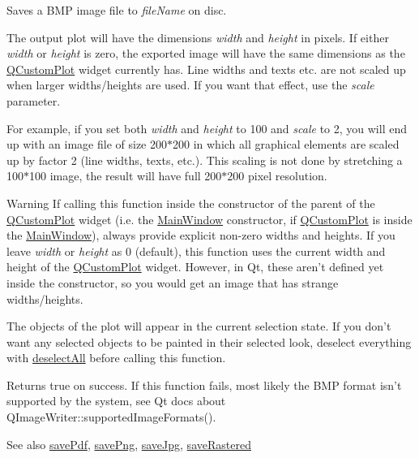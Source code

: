 Saves a B\+M\+P image file to {\itshape file\+Name} on disc. 

The output plot will have the dimensions {\itshape width} and {\itshape height} in pixels. If either {\itshape width} or {\itshape height} is zero, the exported image will have the same dimensions as the \hyperlink{a00030_d8/d00/a00186}{Q\+Custom\+Plot} widget currently has. Line widths and texts etc. are not scaled up when larger widths/heights are used. If you want that effect, use the {\itshape scale} parameter.

For example, if you set both {\itshape width} and {\itshape height} to 100 and {\itshape scale} to 2, you will end up with an image file of size 200$\ast$200 in which all graphical elements are scaled up by factor 2 (line widths, texts, etc.). This scaling is not done by stretching a 100$\ast$100 image, the result will have full 200$\ast$200 pixel resolution.

\begin{DoxyWarning}{Warning}
If calling this function inside the constructor of the parent of the \hyperlink{a00030_d8/d00/a00186}{Q\+Custom\+Plot} widget (i.\+e. the \hyperlink{a00017}{Main\+Window} constructor, if \hyperlink{a00030_d8/d00/a00186}{Q\+Custom\+Plot} is inside the \hyperlink{a00017}{Main\+Window}), always provide explicit non-\/zero widths and heights. If you leave {\itshape width} or {\itshape height} as 0 (default), this function uses the current width and height of the \hyperlink{a00030_d8/d00/a00186}{Q\+Custom\+Plot} widget. However, in Qt, these aren't defined yet inside the constructor, so you would get an image that has strange widths/heights.
\end{DoxyWarning}
The objects of the plot will appear in the current selection state. If you don't want any selected objects to be painted in their selected look, deselect everything with \hyperlink{a00116_a9d4808ab925b003054085246c92a257c}{deselect\+All} before calling this function.

Returns true on success. If this function fails, most likely the B\+M\+P format isn't supported by the system, see Qt docs about Q\+Image\+Writer\+::supported\+Image\+Formats().

\begin{DoxySeeAlso}{See also}
\hyperlink{a00116_a84e33ad7492180f20ff520e557ed102d}{save\+Pdf}, \hyperlink{a00116_a7636261aff1f6d25c9da749ece3fc8b8}{save\+Png}, \hyperlink{a00116_a490c722092d1771e8ce4a7a73dfd84ab}{save\+Jpg}, \hyperlink{a00116_ab528b84cf92baabe29b1d0ef2f77c93e}{save\+Rastered} 
\end{DoxySeeAlso}


